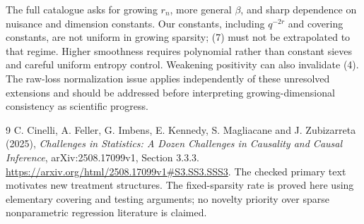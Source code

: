 \documentclass[11pt,a4paper]{article}
\begin{document}
The full catalogue asks for growing $r_n$, more general $\beta$, and sharp dependence on nuisance and dimension constants. Our constants, including $q^{-2r}$ and covering constants, are not uniform in growing sparsity; (7) must not be extrapolated to that regime. Higher smoothness requires polynomial rather than constant sieves and careful uniform entropy control. Weakening positivity can also invalidate (4). The raw-loss normalization issue applies independently of these unresolved extensions and should be addressed before interpreting growing-dimensional consistency as scientific progress.

\begin{thebibliography}{9}
 C. Cinelli, A. Feller, G. Imbens, E. Kennedy, S. Magliacane and J. Zubizarreta (2025), \emph{Challenges in Statistics: A Dozen Challenges in Causality and Causal Inference}, arXiv:2508.17099v1, Section 3.3.3. \url{https://arxiv.org/html/2508.17099v1#S3.SS3.SSS3}. The checked primary text motivates new treatment structures. The fixed-sparsity rate is proved here using elementary covering and testing arguments; no novelty priority over sparse nonparametric regression literature is claimed.
\end{thebibliography}
\end{document}
